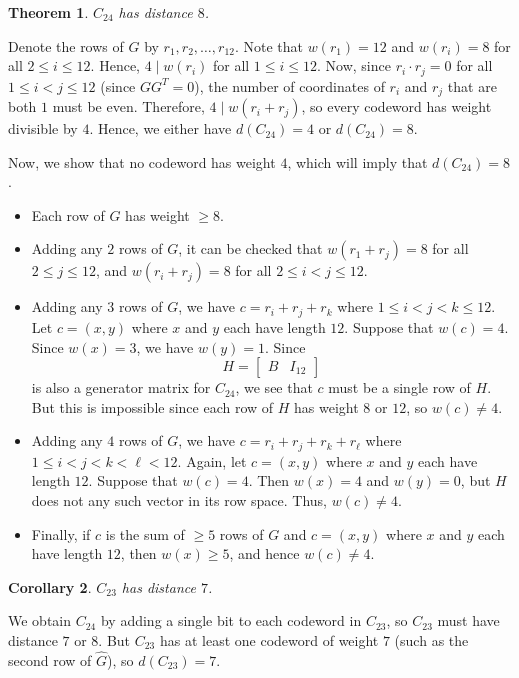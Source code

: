 \documentclass[10pt]{article}
\makeatletter
\theoremstyle{newstyle}
\newtheorem{thm}{Theorem}[subsection]
\newtheorem{cor}[thm]{Corollary}
\newenvironment{pf}[1][\proofname]{\par
  \pushQED{\qed}%
  \normalfont \topsep0\p@\relax
  \trivlist
  \item[\hskip\labelsep\scshape
  #1\@addpunct{.}]\ignorespaces
}{%
  \popQED\endtrivlist\@endpefalse
}
\makeatother
\begin{document}
\begin{thm}
$C_{24}$ has distance $8$.
\end{thm}
\begin{pf}
Denote the rows of $G$ by $r_1, r_2, \dots, r_{12}$. Note that $w(r_1) = 12$ and 
$w(r_i) = 8$ for all $2 \leq i \leq 12$. Hence, $4 \mid w(r_i)$ for all $1 \leq i \leq 12$. 
Now, since $r_i \cdot r_j = 0$ for all $1 \leq i < j \leq 12$
(since $GG^T = 0$), the number of coordinates of $r_i$ and $r_j$ 
that are both $1$ must be even. Therefore, $4 \mid w(r_i + r_j)$, so every codeword has weight divisible 
by $4$. Hence, we either have $d(C_{24}) = 4$ or $d(C_{24}) = 8$. 

\newpage
Now, we show that no codeword has weight $4$, which will imply that $d(C_{24}) = 8$. 
\begin{itemize}
    \item Each row of $G$ has weight $\geq 8$. 
    \item Adding any $2$ rows of $G$, it can be checked that $w(r_1 + r_j) = 8$ for all 
    $2 \leq j \leq 12$, and $w(r_i + r_j) = 8$ for all $2 \leq i < j \leq 12$. 
    \item Adding any $3$ rows of $G$, we have $c = r_i + r_j + r_k$ where 
    $1 \leq i < j < k \leq 12$. Let $c = (x, y)$ where $x$ and $y$ each have length $12$. 
    Suppose that $w(c) = 4$. Since $w(x) = 3$, we have $w(y) = 1$. Since 
    \[ H = \left[ \begin{array}{c|c}
    B & I_{12}
    \end{array} \right] \]
    is also a generator matrix for $C_{24}$, we see that $c$ must be a single row of $H$. 
    But this is impossible since each row of $H$ has weight $8$ or $12$, so $w(c) \neq 4$. 
    \item Adding any $4$ rows of $G$, we have $c = r_i + r_j + r_k + r_\ell$ where 
    $1 \leq i < j < k < \ell < 12$. Again, let $c = (x, y)$ where $x$ and $y$ each have length $12$. 
    Suppose that $w(c) = 4$. Then $w(x) = 4$ and $w(y) = 0$, but $H$ does not any such vector 
    in its row space. Thus, $w(c) \neq 4$. 
    \item Finally, if $c$ is the sum of $\geq 5$ rows of $G$ and $c = (x, y)$ where 
    $x$ and $y$ each have length $12$, then $w(x) \geq 5$, and hence $w(c) \neq 4$. \qedhere 
\end{itemize}
\end{pf}

\begin{cor}
$C_{23}$ has distance $7$. 
\end{cor}
\begin{pf}
We obtain $C_{24}$ by adding a single bit to each codeword in $C_{23}$, so $C_{23}$ must have 
distance $7$ or $8$. But $C_{23}$ has at least one codeword of weight $7$ (such as the 
second row of $\hat G$), so $d(C_{23}) = 7$. 
\end{pf}
\end{document}
